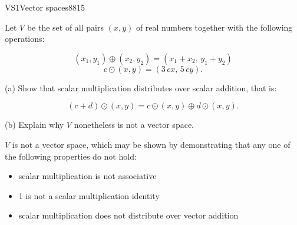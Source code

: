 \begin{exercise}{VS1}{Vector spaces}{8815} 
\begin{exerciseStatement} 

 Let \(V\) be the set of all pairs \((x,y)\) of real numbers together with the following operations: 

 \[(x_1,y_1)\oplus (x_2,y_2)=\left(x_{1} + x_{2},\,y_{1} + y_{2}\right)\]\[c \odot (x,y) =\left(3 \, c x,\,5 \, c y\right).\] 

 (a) Show that scalar multiplication distributes over scalar addition, that is: 

 \[
      (c+d)\odot(x,y)=c\odot(x,y)\oplus d\odot (x,y).
    \] 

 (b) Explain why \(V\) nonetheless is not a vector space. 

 \end{exerciseStatement}
 \begin{exerciseAnswer} 

 \(V\) is not a vector space, which may be shown by demonstrating that any one of the following properties do not hold: 

 

\begin{itemize}
\item scalar multiplication is not associative
\item 1 is not a scalar multiplication identity
\item scalar multiplication does not distribute over vector addition
\end{itemize}

     \end{exerciseAnswer}
 \end{exercise}


